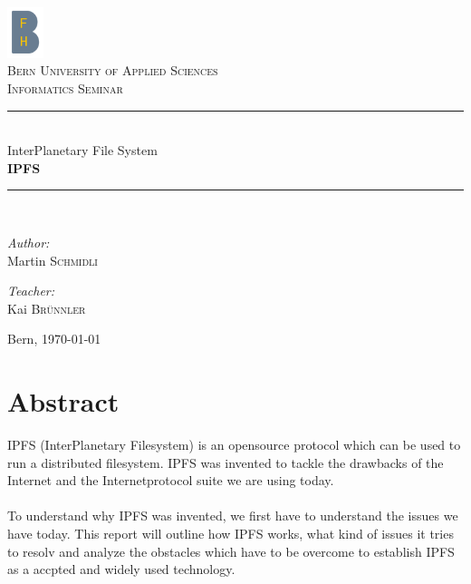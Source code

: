 \documentclass[a4paper,11pt, oneside]{report}
\theoremstyle{definition}
\begin{document}
\pagestyle{empty} %
\begin{titlepage}
\begin{center}

\includegraphics[width=0.08\textwidth]{img/bfh_logo.png}\\[1cm]    
\textsc{\LARGE Bern University of Applied Sciences}\\[1.5cm]
\textsc{\Large Informatics Seminar}\\[0.5cm]

\newcommand{\HRule}{\rule{\linewidth}{0.3mm}}
\HRule \\[0.4cm]
{\huge InterPlanetary File System}\\[0.3cm]
{\huge \bfseries  IPFS}
\HRule \\[1.5cm]

\begin{minipage}{0.4\textwidth}
\begin{flushleft} \large
\emph{Author:}\\
Martin \textsc{Schmidli}\\
\end{flushleft}
\end{minipage}
\hfill
\begin{minipage}{0.4\textwidth}
\begin{flushright} \large
\emph{Teacher:} \\
Kai \textsc{Brünnler}
\end{flushright}
\end{minipage}
\vfill


Bern, {\large \today}
\end{center}
\end{titlepage}
\pagestyle{fancy}

\tableofcontents


\chapter{Abstract}
IPFS (InterPlanetary Filesystem) is an opensource protocol which can be used to run a distributed filesystem. IPFS was invented to tackle the drawbacks of the Internet and the Internetprotocol suite we are using today.\\  \\
To understand why IPFS was invented, we first have to understand the issues we have today. This report will outline how IPFS works, what kind of issues it tries to resolv and analyze the obstacles which have to be overcome to establish IPFS as a accpted and widely used technology.
\end{document}
